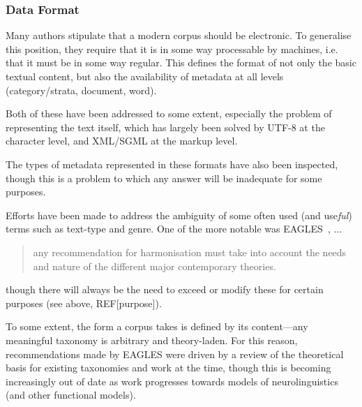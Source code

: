 



\subsubsection{Data Format}
Many authors stipulate that a modern corpus should be electronic.  To generalise this position, they require that it is in some way processable by machines, i.e. that it must be in some way regular.
This defines the format of not only the basic textual content, but also the availability of metadata at all levels (category/strata, document, word).

Both of these have been addressed to some extent, especially the problem of representing the text itself, which has largely been solved by UTF-8 at the character level, and XML/SGML at the markup level.

\cite{ide1995tei}




The types of metadata represented in these formats have also been  inspected, though this is a problem to which any answer will be inadequate for some purposes.


Efforts have been made to address the ambiguity of some often used (and use\textit{ful}) terms such as text-type and genre.  One of the more notable was EAGLES~\cite{EagTcwgCtypeaglespreliminary}, ...

\begin{quote}
any recommendation for harmonisation must take into account the needs and nature of the different major contemporary theories.
\end{quote}

though there will always be the need to exceed or modify these for certain purposes (see above, REF[purpose]).


To some extent, the form a corpus takes is defined by its content---any meaningful taxonomy is arbitrary and theory-laden.  For this reason, recommendations made by EAGLES were driven by a review of the theoretical basis for existing taxonomies and work at the time, though this is becoming increasingly out of date as work progresses towards models of neurolinguistics (and other functional models).

